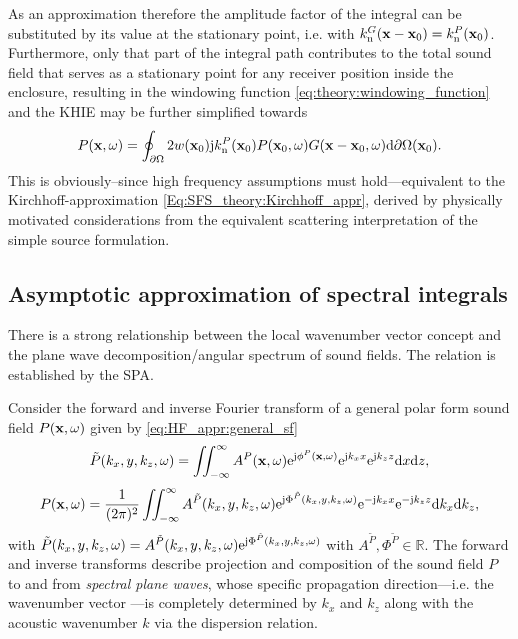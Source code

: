 As an approximation therefore the amplitude factor of the integral can be substituted by its value at the stationary point, i.e. with $k_{\mathrm{n}}^G(\mathbf{x}-\mathbf{x}_0) = k_{\mathrm{n}}^P(\mathbf{x}_0)$.
Furthermore, only that part of the integral path contributes to the total sound field that serves as a stationary point for any receiver position inside the enclosure,
resulting in the windowing function \eqref{eq:theory:windowing_function} and the KHIE may be further simplified towards
\begin{equation}
P(\mathbf{x},\omega) = 
\oint_{\partial \Omega} 
2 w(\mathbf{x}_0) \mathrm{j} k_{\mathrm{n}}^P(\mathbf{x}_0) 
P(\mathbf{x}_0,\omega) G(\mathbf{x}-\mathbf{x}_0,\omega)  \mathrm{d} \partial \Omega( \mathbf{x}_0).
\label{Eq:HF_appr:Kirchhoff_approximation}
\end{equation}
This is obviously--since high frequency assumptions must hold---equivalent to the Kirchhoff-approximation \eqref{Eq:SFS_theory:Kirchhoff_appr}, derived by physically motivated considerations from the equivalent scattering interpretation of the simple source formulation.

\subsection{Asymptotic approximation of spectral integrals}
\label{Sec:SPA_for_Fourier}
There is a strong relationship between the local wavenumber vector concept and the plane wave decomposition/angular spectrum of sound fields.
The relation is established by the SPA.

Consider the forward and inverse Fourier transform of a general polar form sound field $P(\mathbf{x},\omega)$ given by \eqref{eq:HF_appr:general_sf}
\begin{equation}
\tilde{P}(k_x,y,k_z,\omega) = \iint_{-\infty}^{\infty} A^P(\mathbf{x},\omega)\mathrm{e}^{\mathrm{j} \phi^P(\mathbf{x},\omega)} \mathrm{e}^{\mathrm{j} k_x x} \mathrm{e}^{\mathrm{j} k_z z} \mathrm{d} x \mathrm{d} z,
\label{eq:forward_transform}
\end{equation}
\begin{equation}
P(\mathbf{x},\omega) = \frac{1}{(2\pi)^2} \iint_{-\infty}^{\infty} A^{\tilde{P}}(k_x,y,k_z,\omega)\mathrm{e}^{\mathrm{j} \Phi^{\tilde{P}}(k_x,y,k_z,\omega)}  \mathrm{e}^{-\mathrm{j} k_x x} \mathrm{e}^{-\mathrm{j} k_z z} \mathrm{d} k_x \mathrm{d} k_z,
\label{eq:inverse_transform}
\end{equation}
with $\tilde{P}(k_x,y,k_z,\omega) = A^{\tilde{P}}(k_x,y,k_z,\omega)\mathrm{e}^{\mathrm{j} \Phi^{\tilde{P}}(k_x,y,k_z,\omega)}$ with $A^{\tilde{P}}, \Phi^{\tilde{P}}\in\mathbb{R}$.
The forward and inverse transforms describe projection and composition of the sound field $P$ to and from \emph{spectral plane waves}, whose specific propagation direction---i.e. the wavenumber vector ---is completely determined by $k_x$ and $k_z$ along with the acoustic wavenumber $k$ via the dispersion relation.

